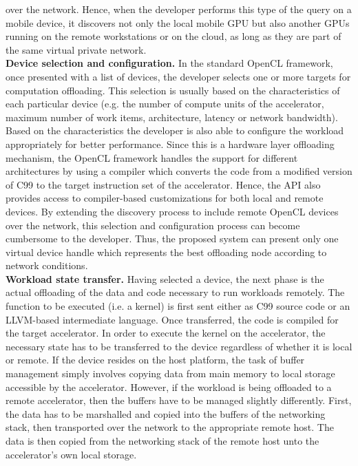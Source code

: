over the network.
%
Hence, when the developer performs this type of the query on a mobile
device, it discovers not only the local mobile GPU but also another GPUs
running on the remote workstations or on the cloud, as long as they are
part of the same virtual private network.\\
%
{\bf Device selection and configuration.} In the standard OpenCL
framework, once presented with a list of devices, the developer selects
one or more targets for computation offloading.
%
This selection is usually based on the characteristics of each particular
device (e.g. the number of compute units of the accelerator, maximum
number of work items, architecture, latency or network bandwidth).
%
Based on the characteristics the developer is also able to configure the
workload appropriately for better performance.
%
Since this is a hardware layer offloading mechanism, the OpenCL framework
handles the support for different architectures by using a compiler
which converts the code from a modified version of C99 to the target
instruction set of the accelerator.
%
Hence, the API also provides access to compiler-based customizations for
both local and remote devices.
%
By extending the discovery process to include remote OpenCL devices over
the network, this selection and configuration process can become
cumbersome to the developer.
%
Thus, the proposed system can present only one virtual device handle
which represents the best offloading node according to network
conditions.\\
%
{\bf Workload state transfer.} Having selected a device, the next phase 
is the actual offloading of the data and code necessary to run workloads 
remotely.
%
The function to be executed (i.e. a kernel) is first sent either as C99 source
code or an LLVM-based intermediate language.
%
Once transferred, the code is compiled for the target accelerator.
%
In order to execute the kernel on the accelerator, the necessary state has
to be transferred to the device regardless of whether it is local or remote.
%
If the device resides on the host platform, the task of buffer management 
simply involves copying data from main memory to local storage accessible 
by the accelerator.
%
However, if the workload is being offloaded to a remote accelerator, then
the buffers have to be managed slightly differently.
%
First, the data has to be marshalled and copied into the buffers of the
networking stack, then transported over the network to the appropriate
remote host.
%
The data is then copied from the networking stack of the remote host
unto the accelerator's own local storage.
